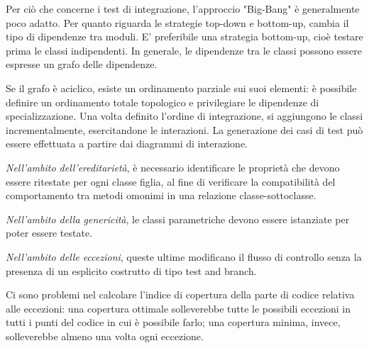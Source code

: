 \documentclass{article}
\begin{document}
        \vspace{3mm}
        
        Per ciò che concerne i test di integrazione, l'approccio "Big-Bang" è generalmente poco adatto. Per quanto riguarda le strategie top-down e bottom-up, cambia il tipo di dipendenze tra moduli. E' preferibile una strategia bottom-up, cioè testare prima le classi indipendenti. In generale, le dipendenze tra le classi possono essere espresse un grafo delle dipendenze. 
        
        Se il grafo è aciclico, esiste un ordinamento parziale sui suoi elementi: è possibile definire un ordinamento totale topologico e privilegiare le dipendenze di specializzazione. Una volta definito l'ordine di integrazione, si aggiungono le classi incrementalmente, esercitandone le interazioni. La generazione dei casi di test può essere effettuata a partire dai diagrammi di interazione.
        
        \vspace{3mm}
        
        \textit{Nell'ambito dell'ereditarietà}, è necessario identificare le proprietà che devono essere ritestate per ogni classe figlia, al fine di verificare la compatibilità del comportamento tra metodi omonimi in una relazione classe-sottoclasse.
        
        \textit{Nell'ambito della genericità}, le classi parametriche devono essere istanziate per poter essere testate.
        
        \textit{Nell'ambito delle eccezioni}, queste ultime modificano il flusso di controllo senza la presenza di un esplicito costrutto di tipo test and branch. 
        
        \vspace{3mm}
        
        Ci sono problemi nel calcolare l'indice di copertura della parte di codice relativa alle eccezioni: una copertura ottimale solleverebbe tutte le possibili eccezioni in tutti i punti del codice in cui è possibile farlo; una copertura minima, invece, solleverebbe almeno una volta ogni eccezione.
\end{document}
